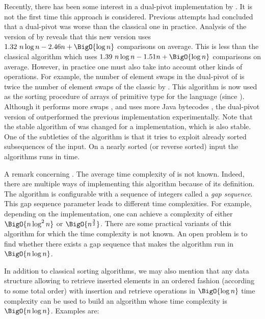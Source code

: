 Recently, there has been some interest in a dual-pivot \quicksort
implementation by \citet*{yaroslavskiy:2009}. It is not the first time this
approach is considered. Previous attempts \cite{sedgewick:1980} had concluded
that a dual-pivot \quicksort was worse than the classical one in practice.
Analysis of the version of \citet*{yaroslavskiy:2009} by \citet*{wild:2012}
reveals that this new version uses \(1.32~n \log n - 2.46n + \BigO{\log n}\)
comparisons on average. This is less than the classical \quicksort algorithm which uses
\(1.39~n \log n - 1.51n + \BigO{\log n}\) comparisons on average. However, in practice one must also take into account
other kinds of operations. For example, the number of element swaps in the
dual-pivot \quicksort of \citeauthor{yaroslavskiy:2009} is twice the number of
element swaps of the classic \quicksort by \citeauthor{hoare:1962}. This
algorithm is now used as the sorting procedure of arrays of primitive type for
the \Java language (since ). Although it performs more
swaps \cite{wild:2012}, and uses more Java bytecodes \cite{wild:2013}, the
dual-pivot version of \citet*{yaroslavskiy:2009} outperformed the previous
\quicksort implementation experimentally. Note that the stable \mergesort
algorithm of  was changed for a \timsort implementation, which is
also stable. One of the subtleties of the \timsort algorithm is that it tries
to exploit already sorted subsequences of the input. On a nearly sorted (or
reverse sorted) input the \timsort algorithms runs in  time.

A remark concerning \shellsort. The average time complexity of \shellsort is not
known. Indeed, there are multiple ways of implementing this
algorithm because of its definition. The \shellsort algorithm is configurable
with a sequence of integers called a \emph{gap sequence}. This gap sequence
parameter leads to different time complexities. For example, depending on the
implementation, one can achieve a complexity of either $\BigO{n \log^2 n}$ or
$\BigO{n^{\frac{3}{2}}}$. There are some practical variants of this algorithm
for which the time complexity is not known. An open problem is to find whether
there exists a gap sequence that makes the algorithm run in $\BigO{n \log
n}$.

In addition to classical sorting algorithms, we may also mention that any data
structure allowing to retrieve inserted elements in an ordered fashion
(according to some total order) with insertion and retrieve operations in
$\BigO{\log n}$ time complexity can be used to build an algorithm whose time
complexity is $\BigO{n \log n}$. Examples are:

